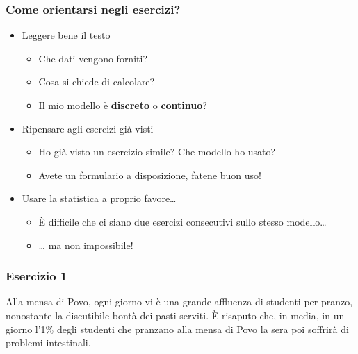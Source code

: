 \documentclass{beamer}
\begin{document}
\begin{frame}[fragile]
	\frametitle{Come orientarsi negli esercizi?}

	\begin{itemize}
		\item<1-4> Leggere bene il testo
		\begin{itemize}
			\item<2-4> Che dati vengono forniti?
			\item<3-4> Cosa si chiede di calcolare?
			\item<4> Il mio modello è \textbf{discreto} o \textbf{continuo}?
		\end{itemize}
		\item<5-7> Ripensare agli esercizi già visti
		\begin{itemize}
			\item<6-7> Ho già visto un esercizio simile? Che modello ho usato?
			\item<7> Avete un formulario a disposizione, fatene buon uso!
		\end{itemize}
		\item<8-10> Usare la statistica a proprio favore\dots \begin{itemize}
			\item<9-10> È difficile che ci siano due esercizi consecutivi sullo stesso modello\dots
			\item<10> \dots { \footnotesize ma non impossibile! }
		\end{itemize}
		
	\end{itemize}
\end{frame}

\begin{frame}[fragile]
	\frametitle{Esercizio 1}

	Alla mensa di Povo, ogni giorno vi è una grande affluenza di studenti per pranzo, nonostante la discutibile bontà dei pasti serviti. È risaputo che, in media, in un giorno l'1\% degli studenti che pranzano alla mensa di Povo la sera poi soffrirà di problemi intestinali.


\end{frame}
\end{document}
